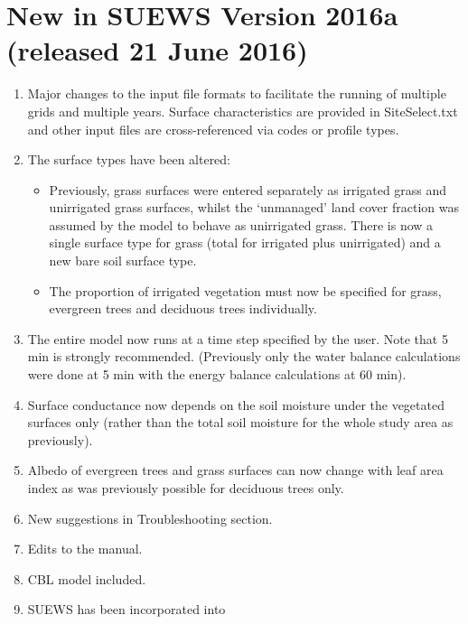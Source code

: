 \documentclass[letterpaper,10pt,english]{sphinxmanual}
\begin{document}
\section{New in SUEWS Version 2016a (released 21 June 2016)}
\label{\detokenize{version-history:new-in-suews-version-2016a-released-21-june-2016}}
\begin{enumerate}
\item {} 
Major changes to the input file formats to facilitate the running of
multiple grids and multiple years. Surface characteristics are
provided in SiteSelect.txt and other input files are cross-referenced
via codes or profile types.

\item {} 
The surface types have been altered:
\begin{itemize}
\item {} 
Previously, grass surfaces were entered separately as irrigated
grass and unirrigated grass surfaces, whilst the ‘unmanaged’ land
cover fraction was assumed by the model to behave as unirrigated
grass. There is now a single surface type for grass (total for
irrigated plus unirrigated) and a new bare soil surface type.

\item {} 
The proportion of irrigated vegetation must now be specified for
grass, evergreen trees and deciduous trees individually.

\end{itemize}

\item {} 
The entire model now runs at a time step specified by the user. Note
that 5 min is strongly recommended. (Previously only the water
balance calculations were done at 5 min with the energy balance
calculations at 60 min).

\item {} 
Surface conductance now depends on the soil moisture under the
vegetated surfaces only (rather than the total soil moisture for the
whole study area as previously).

\item {} 
Albedo of evergreen trees and grass surfaces can now change with leaf
area index as was previously possible for deciduous trees only.

\item {} 
New suggestions in Troubleshooting section.

\item {} 
Edits to the manual.

\item {} 
CBL model included.

\item {} 
SUEWS has been incorporated into

\end{enumerate}
\end{document}
